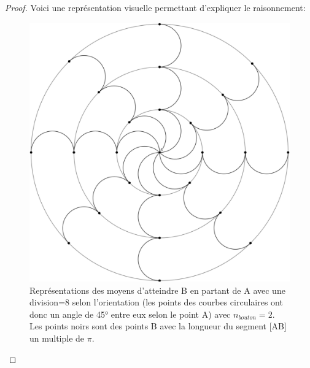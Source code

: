 \documentclass{amsart}
\theoremstyle{definition}
\theoremstyle{remark}
\numberwithin{equation}{section}
\begin{document}
\begin{proof}
  Voici une représentation visuelle permettant d'expliquer le raisonnement:
  \begin{figure}[!h]
    \centering
    \includegraphics[scale=0.27]{visualization.png}
    \caption{Représentations des moyens d'atteindre B en partant de A avec une division=8 selon l'orientation (les points des courbes circulaires ont donc un angle de 45° entre eux selon le point A) avec $n_{bouton}=2$. 
    Les points noirs sont des points B avec la longueur du segment [AB] un multiple de $\pi$.}
  \end{figure}
\end{proof}
\end{document}
